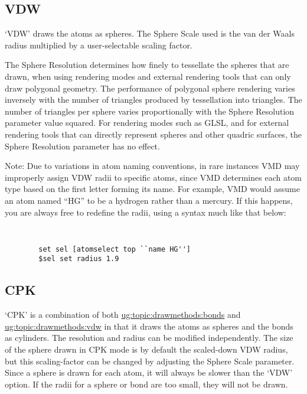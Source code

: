 \subsection{VDW}
\label{ug:topic:drawmethods:vdw}
`VDW' draws the atoms as spheres.  The {\sf Sphere Scale} used is the van der
Waals radius multiplied by a user-selectable scaling factor.  

The {\sf Sphere Resolution} determines how finely to tessellate 
the spheres that are drawn, when using rendering modes and external rendering
tools that can only draw polygonal geometry.  The performance of 
polygonal sphere rendering varies inversely with the number of triangles
produced by tessellation into triangles.  The number of triangles per
sphere varies proportionally with the {\sf Sphere Resolution} parameter 
value squared.  For rendering modes such as GLSL, and for external 
rendering tools that can directly represent spheres and 
other quadric surfaces,  the {\sf Sphere Resolution} parameter has no effect.

Note: Due to variations in atom naming conventions, in rare instances VMD may
improperly assign VDW radii to specific atoms, since VMD determines each atom
type based on the first letter forming its name. For example, VMD would assume
an atom named ``HG'' to be a hydrogen rather than a mercury.  If this happens,
you are always free to redefine the radii, using a syntax much
like that below:
{\tt
\begin{verbatim}
        set sel [atomselect top ``name HG'']
        $sel set radius 1.9
\end{verbatim}
}

\subsection{CPK}
\label{ug:topic:drawmethods:cpk}
`CPK' is a combination of both 
\hyperref{`Bonds'}{`Bonds'[\S~}{]}{ug:topic:drawmethods:bonds} and 
\hyperref{`VDW'}{`VDW'[\S~}{]}{ug:topic:drawmethods:vdw} 
in that it draws the atoms as spheres and the bonds as cylinders.  
The resolution and radius can be modified independently.  
The size of the sphere drawn in CPK mode is by default the
scaled-down VDW radius, but this scaling-factor can be changed by adjusting
the {\sf Sphere Scale} parameter.  Since a sphere is drawn for each atom, it
will always be slower than the `VDW' option.
If the radii for a sphere or bond are too small, they will not be drawn.

